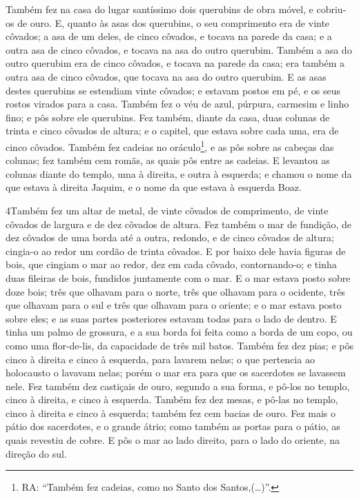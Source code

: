 Também fez na casa do lugar santíssimo dois querubins de obra
móvel, e cobriu-os de ouro. E, quanto às asas dos querubins,
o seu comprimento era de vinte côvados; a asa de um deles, de cinco
côvados, e tocava na parede da casa; e a outra asa de cinco côvados,
e tocava na asa do outro querubim. Também a asa do outro
querubim era de cinco côvados, e tocava na parede da casa; era
também a outra asa de cinco côvados, que tocava na asa do outro
querubim. E as asas destes querubins se estendiam vinte
côvados; e estavam postos em pé, e os seus rostos virados para a
casa. Também fez o véu de azul, púrpura, carmesim e linho
fino; e pôs sobre ele querubins. Fez também, diante da casa,
duas colunas de trinta e cinco côvados de altura; e o capitel, que
estava sobre cada uma, era de cinco côvados. Também fez
cadeias no oráculo\footnote{RA: ``Também fez cadeias, como no Santo
dos Santos,(\ldots)''.}, e as pôs sobre as cabeças das colunas; fez
também cem romãs, as quais pôs entre as cadeias. E levantou
as colunas diante do templo, uma à direita, e outra à esquerda; e
chamou o nome da que estava à direita Jaquim, e o nome da que estava
à esquerda Boaz.

\medskip

\lettrine{4} Também fez um altar de metal, de vinte côvados de
comprimento, de vinte côvados de largura e de dez côvados de altura.
Fez também o mar de fundição, de dez côvados de uma borda até a
outra, redondo, e de cinco côvados de altura; cingia-o ao redor um
cordão de trinta côvados. E por baixo dele havia figuras de
bois, que cingiam o mar ao redor, dez em cada côvado, contornando-o;
e tinha duas fileiras de bois, fundidos juntamente com o mar. E
o mar estava posto sobre doze bois; três que olhavam para o norte,
três que olhavam para o ocidente, três que olhavam para o sul e três
que olhavam para o oriente; e o mar estava posto sobre eles; e as
suas partes posteriores estavam todas para o lado de dentro. E
tinha um palmo de grossura, e a sua borda foi feita como a borda de
um copo, ou como uma flor-de-lis, da capacidade de três mil batos.
Também fez dez pias; e pôs cinco à direita e cinco à esquerda,
para lavarem nelas; o que pertencia ao holocausto o lavavam nelas;
porém o mar era para que os sacerdotes se lavassem nele. Fez
também dez castiçais de ouro, segundo a sua forma, e pô-los no
templo, cinco à direita, e cinco à esquerda. Também fez dez
mesas, e pô-las no templo, cinco à direita e cinco à esquerda;
também fez cem bacias de ouro. Fez mais o pátio dos sacerdotes,
e o grande átrio; como também as portas para o pátio, as quais
revestiu de cobre. E pôs o mar ao lado direito, para o lado
do oriente, na direção do sul.

